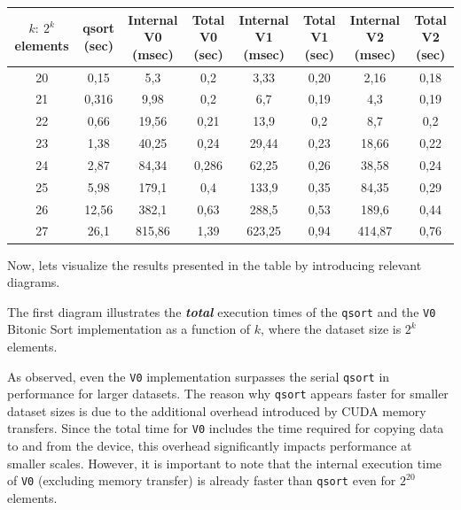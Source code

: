 \documentclass[12pt]{article}
\begin{document}
\begin{tabular}{|c|c|c|c|c|c|c|c|}
\hline
\makecell{\( k:\ 2^k \)\\elements} & \makecell{qsort\\(sec)} & \makecell{Internal V0\\(msec)} & \makecell{Total V0\\(sec)} & \makecell{Internal V1\\(msec)} & \makecell{Total V1\\(sec)} & \makecell{Internal V2\\(msec)} & \makecell{Total V2\\(sec)} \\
\hline
20 & 0,15 & 5,3 & 0,2 & 3,33 & 0,20 & 2,16 & 0,18 \\
\hline
21 & 0,316 & 9,98 & 0,2 & 6,7 & 0,19 & 4,3 & 0,19 \\
\hline
22 & 0,66 & 19,56 & 0,21 & 13,9 & 0,2 & 8,7 & 0,2 \\
\hline
23 & 1,38 & 40,25 & 0,24 & 29,44 & 0,23 & 18,66 & 0,22 \\
\hline
24 & 2,87 & 84,34 & 0,286 & 62,25 & 0,26 & 38,58 & 0,24 \\
\hline
25 & 5,98 & 179,1 & 0,4 & 133,9 & 0,35 & 84,35 & 0,29 \\
\hline
26 & 12,56 & 382,1 & 0,63 & 288,5 & 0,53 & 189,6 & 0,44 \\
\hline
27 & 26,1 & 815,86 & 1,39 & 623,25 & 0,94 & 414,87 & 0,76 \\
\hline
\end{tabular}

\vspace{+10pt}
Now, lets visualize the results presented in the table by introducing relevant diagrams. 

The first diagram illustrates the \textbf{\textit{total}} execution times of the \texttt{qsort} and the \texttt{V0} Bitonic Sort implementation as a function of \( k \), where the dataset size is \( 2^k \) elements. 

As observed, even the \texttt{V0} implementation surpasses the serial \texttt{qsort} in performance for larger datasets. The reason why \texttt{qsort} appears faster for smaller dataset sizes is due to the additional overhead introduced by CUDA memory transfers. Since the total time for \texttt{V0} includes the time required for copying data to and from the device, this overhead significantly impacts performance at smaller scales. However, it is important to note that the internal execution time of \texttt{V0} (excluding memory transfer) is already faster than \texttt{qsort} even for \( 2^{20} \) elements.
\end{document}
